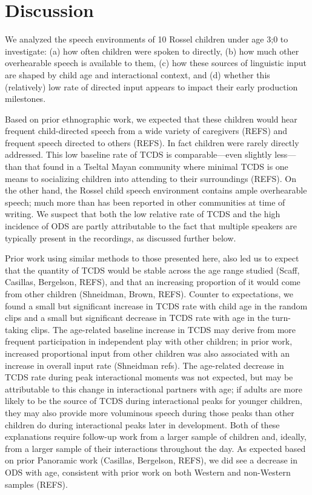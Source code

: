 \documentclass[,man,floatsintext]{apa6}
\begin{document}
\section{Discussion}\label{disc}

We analyzed the speech environments of 10 Rossel children under age 3;0
to investigate: (a) how often children were spoken to directly, (b) how
much other overhearable speech is available to them, (c) how these
sources of linguistic input are shaped by child age and interactional
context, and (d) whether this (relatively) low rate of directed input
appears to impact their early production milestones.

Based on prior ethnographic work, we expected that these children would
hear frequent child-directed speech from a wide variety of caregivers
(REFS) and frequent speech directed to others (REFS). In fact children
were rarely directly addressed. This low baseline rate of TCDS is
comparable---even slightly less---than that found in a Tseltal Mayan
community where minimal TCDS is one means to socializing children into
attending to their surroundings (REFS). On the other hand, the Rossel
child speech environment contains ample overhearable speech; much more
than has been reported in other communities at time of writing. We
suspect that both the low relative rate of TCDS and the high incidence
of ODS are partly attributable to the fact that multiple speakers are
typically present in the recordings, as discussed further below.

Prior work using similar methods to those presented here, also led us to
expect that the quantity of TCDS would be stable across the age range
studied (Scaff, Casillas, Bergelson, REFS), and that an increasing
proportion of it would come from other children (Shneidman, Brown,
REFS). Counter to expectations, we found a small but significant
increase in TCDS rate with child age in the random clips and a small but
significant decrease in TCDS rate with age in the turn-taking clips. The
age-related baseline increase in TCDS may derive from more frequent
participation in independent play with other children; in prior work,
increased proportional input from other children was also associated
with an increase in overall input rate (Shneidman refs). The age-related
decrease in TCDS rate during peak interactional moments was not
expected, but may be attributable to this change in interactional
partners with age; if adults are more likely to be the source of TCDS
during interactional peaks for younger children, they may also provide
more voluminous speech during those peaks than other children do during
interactional peaks later in development. Both of these explanations
require follow-up work from a larger sample of children and, ideally,
from a larger sample of their interactions throughout the day. As
expected based on prior Panoramic work (Casillas, Bergelson, REFS), we
did see a decrease in ODS with age, consistent with prior work on both
Western and non-Western samples (REFS).
\end{document}
